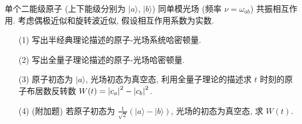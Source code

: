 \documentclass{assignment}
\begin{document}
\begin{prob}
    单个二能级原子 (上下能级分别为 $\lvert a\rangle$, $\lvert b\rangle$) 同单模光场 (频率 $\nu=\omega_{ab}$) 共振相互作用. 考虑偶极近似和旋转波近似, 假设相互作用系数为实数.
    \begin{itemize}
        \item[(1)] 写出半经典理论描述的原子-光场系统哈密顿量.
        \item[(2)] 写出全量子理论描述的原子-光场哈密顿量.
        \item[(3)] 原子初态为 $\lvert a\rangle$, 光场初态为真空态, 利用全量子理论的描述求 $t$ 时刻的原子布居数反转数 $W(t)=\left\lvert c_a\right\rvert^2-\left\lvert c_b\right\rvert^2$.
        \item[(4)] (附加题) 若原子初态为 $\frac{1}{\sqrt{2}}(\lvert a\rangle-\lvert b\rangle)$, 光场的初态为真空态, 求 $W(t)$.
    \end{itemize}
\end{prob}
\end{document}
